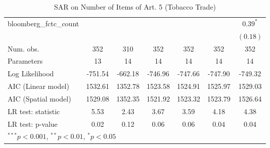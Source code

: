 \begin{table}[!h]
\begin{center}
\begin{tabular}{l c c c c c c }
bloomberg\_fctc\_count  &              &              &              &              &              & $0.39^{*}$   \\
                        &              &              &              &              &              & $(0.18)$     \\
\midrule
Num. obs.               & 352          & 310          & 352          & 352          & 352          & 352          \\
Parameters              & 13           & 14           & 14           & 14           & 14           & 14           \\
Log Likelihood          & -751.54      & -662.18      & -746.96      & -747.66      & -747.90      & -749.32      \\
AIC (Linear model)      & 1532.61      & 1352.78      & 1523.58      & 1524.91      & 1525.97      & 1529.03      \\
AIC (Spatial model)     & 1529.08      & 1352.35      & 1521.92      & 1523.32      & 1523.79      & 1526.64      \\
LR test: statistic      & 5.53         & 2.43         & 3.67         & 3.59         & 4.18         & 4.38         \\
LR test: p-value        & 0.02         & 0.12         & 0.06         & 0.06         & 0.04         & 0.04         \\
\bottomrule
\multicolumn{7}{l}{\scriptsize{$^{***}p<0.001$, $^{**}p<0.01$, $^*p<0.05$}}
\end{tabular}
\caption{SAR on Number of Items of Art. 5 (Tobacco Trade)}
\label{table:coefficients}
\end{center}
\end{table}

